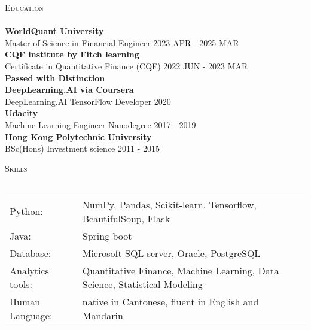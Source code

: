 \documentclass[a4paper]{article}
\newcommand{\lineunder} {
    \vspace*{-8pt} \\
    \hspace*{-18pt} \hrulefill \\
}
\newcommand{\header} [1] {
    {\hspace*{-18pt}\vspace*{6pt} \textsc{#1}}
    \vspace*{-6pt} \lineunder
}
\begin{document}
\header{Education}
\textbf{WorldQuant University}\\
Master of Science in Financial Engineer \hfill 2023 APR - 2025 MAR\\
\vspace{2mm}
\textbf{CQF institute by Fitch learning}\\
Certificate in Quantitative Finance (CQF) \hfill 2022 JUN - 2023 MAR\\
\textbf{Passed with Distinction}\\
\vspace{2mm}
\textbf{DeepLearning.AI via Coursera}\\
DeepLearning.AI TensorFlow Developer \hfill 2020\\
\vspace{2mm}
\textbf{Udacity}\\
Machine Learning Engineer Nanodegree \hfill 2017 - 2019\\
\vspace{2mm}
\textbf{Hong Kong Polytechnic University}\\
BSc(Hons) Investment science \hfill 2011 - 2015\\
\vspace{2mm}

\header{Skills}
\begin{tabular}{ l l }
    Python:          & NumPy, Pandas, Scikit-learn, Tensorflow, BeautifulSoup, Flask                        \\
    Java:            & Spring boot                                                                \\
    Database:        & Microsoft SQL server, Oracle, PostgreSQL                                   \\
    Analytics tools: & Quantitative Finance, Machine Learning, Data Science, Statistical Modeling \\
        Human Language:  & native in Cantonese, fluent in English and Mandarin
\end{tabular}
\vspace{2mm}





\ 
\end{document}
